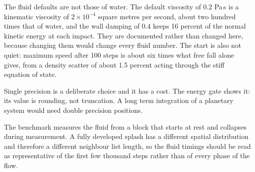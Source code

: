 The fluid defaults are not those of water. The default viscosity of 0.2 Pa\,s is a
kinematic viscosity of $2 \times 10^{-4}$ square metres per second, about two hundred times
that of water, and the wall damping of 0.4 keeps 16 percent of the normal kinetic energy at
each impact. They are documented rather than changed here, because changing them would
change every fluid number. The start is also not quiet: maximum speed after 100 steps is
about six times what free fall alone gives, from a density scatter of about 1.5 percent
acting through the stiff equation of state.

Single precision is a deliberate choice and it has a cost. The energy gate shows it: its
value is rounding, not truncation. A long term integration of a planetary system would need
double precision positions.

The benchmark measures the fluid from a block that starts at rest and collapses during
measurement. A fully developed splash has a different spatial distribution and therefore a
different neighbour list length, so the fluid timings should be read as representative of
the first few thousand steps rather than of every phase of the flow.
